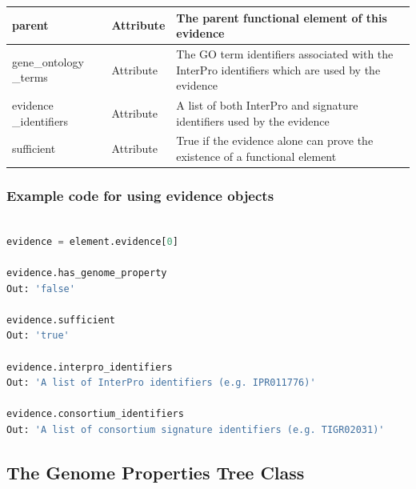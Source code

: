 \begin{longtable}{|p{2.7cm}|p{2cm}|p{10cm}|}
parent                  & Attribute     & The parent functional element of this evidence                                                                                                      \\ \hline
gene\_ontology \_terms   & Attribute     & The GO term identifiers associated with the InterPro identifiers which are used by the evidence                                                     \\ \hline
evidence \_identifiers   & Attribute     & A list of both InterPro and signature identifiers used by the evidence                                                                              \\ \hline
sufficient              & Attribute     & True if the evidence alone can prove the existence of a functional element                                                                          \\ \hline
\end{longtable}

\subsubsection{Example code for using evidence objects}

\begin{lstlisting}[language=Python]

evidence = element.evidence[0]
	
evidence.has_genome_property
Out: 'false'

evidence.sufficient
Out: 'true'

evidence.interpro_identifiers
Out: 'A list of InterPro identifiers (e.g. IPR011776)'

evidence.consortium_identifiers 
Out: 'A list of consortium signature identifiers (e.g. TIGR02031)'

\end{lstlisting}

\subsection{The Genome Properties Tree Class}

